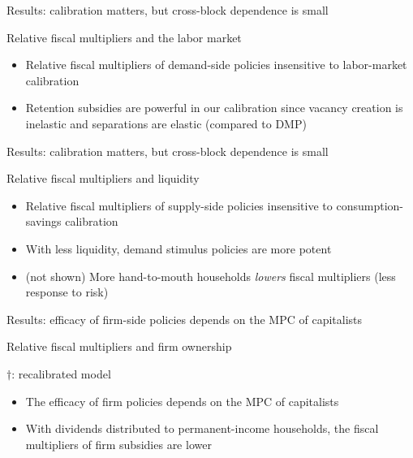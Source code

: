 \documentclass[aspectratio=169]{beamer}
\begin{document}
\begin{frame}{Results: calibration matters, but cross-block dependence is small}

\begin{block}{Relative fiscal multipliers and the labor market}
        \begin{center}
            
        \end{center}
    \end{block}

    \begin{itemize}
        \item Relative fiscal multipliers of demand-side policies insensitive to labor-market calibration
        \item Retention subsidies are powerful in our calibration since vacancy creation is inelastic and separations are elastic (compared to DMP)
    \end{itemize}
\end{frame}

\begin{frame}{Results: calibration matters, but cross-block dependence is small}
    
    \begin{block}{Relative fiscal multipliers and liquidity}
    \begin{center}
        
    \end{center}
    \end{block}

    \begin{itemize}
        \item Relative fiscal multipliers of supply-side policies insensitive to consumption-savings calibration
        \item With less liquidity, demand stimulus policies are more potent
        \item (not shown) More hand-to-mouth households \emph{lowers} fiscal multipliers (less response to risk)
    \end{itemize}

\end{frame}

\begin{frame}{Results: efficacy of firm-side policies depends on the MPC of capitalists}
    \begin{block}{Relative fiscal multipliers and firm ownership}
        \begin{center}
            
        \end{center}
        $\dagger$: recalibrated model
        \end{block}
    \begin{itemize}
        \item The efficacy of firm policies depends on the MPC of capitalists
        \item With dividends distributed to permanent-income households, the fiscal multipliers of firm subsidies are lower 
    \end{itemize}
\end{frame}
\end{document}
